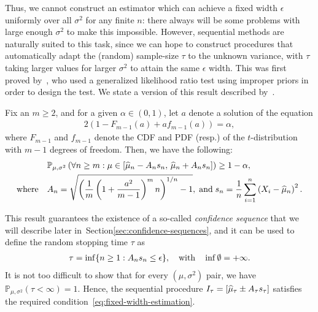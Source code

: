\documentclass[12pt]{article}
\begin{document}
Thus, we cannot construct an estimator which can achieve a fixed width $\epsilon$ uniformly over all $\sigma^2$ for any finite $n$: there always will be some problems with large enough $\sigma^2$ to make this impossible. However, sequential methods are naturally suited to this task, since we can hope to construct procedures that automatically adapt the (random) sample-size $\tau$ to the unknown variance, with $\tau$ taking larger values for larger $\sigma^2$ to attain the same $\epsilon$ width. This was first proved by~\citet{lai1976confidence}, who used a generalized likelihood ratio test using improper priors in order to design the test.  We state a version of this result described by~\citet[Theorem 4.1]{wang2025anytime}. 
\begin{proposition}
    \label{prop:wang-ramdas-t-test} Fix an $m \geq 2$, and for a given $\alpha \in (0, 1)$, let $a$ denote a solution of the equation 
    \begin{align}
        2(1-F_{m-1}(a) + a f_{m-1}(a)) = \alpha, 
    \end{align}
    where $F_{m-1}$ and $f_{m-1}$ denote the CDF and PDF (resp.) of the $t$-distribution with $m-1$ degrees of freedom. Then, we have the following: 
    \begin{align}
        &\mathbb{P}_{\mu, \sigma^2}\left( \forall n \geq m: \mu \in  \left[ \widehat{\mu}_n - A_n s_n, \, \widehat{\mu}_n + A_n s_n \right] \right) \geq 1-\alpha, \\ 
        \text{where} \quad &A_n =  \sqrt{\left( \frac{1}{m}\left( 1 + \frac{a^2}{m-1}\right)^{m}n \right)^{1/n} - 1}, \; \text{and} \; 
        s_n = \frac{1}n \sum_{i=1}^n \left( X_i - \widehat{\mu}_n \right)^2. 
    \end{align}
\end{proposition}
This result guarantees the existence of a so-called \emph{confidence sequence} that we will describe later in~Section\ref{sec:confidence-sequences}, and it can be used to define the random stopping time $\tau$ as 
\begin{align}
    \tau = \inf \{n \geq 1: A_n s_n \leq \epsilon\}, \quad \text{with} \quad \inf \emptyset = + \infty. 
\end{align}
It is not too difficult to show that for every $(\mu, \sigma^2)$ pair, we have $\mathbb{P}_{\mu, \sigma^2}(\tau< \infty) = 1$. Hence, the sequential procedure $I_\tau = [\widehat{\mu}_\tau \pm A_\tau s_\tau]$ satisfies the required condition~\eqref{eq:fixed-width-estimation}. 
\end{document}
